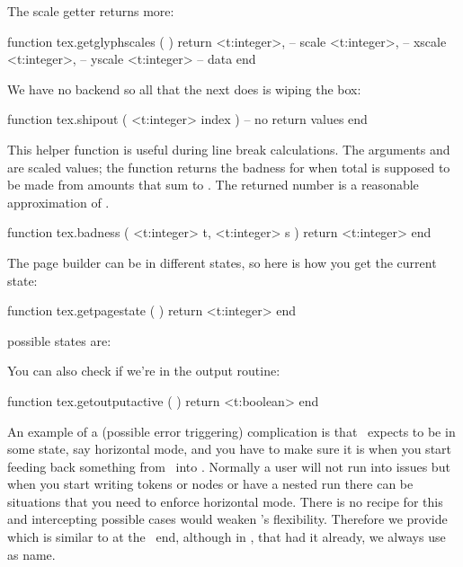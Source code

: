 The scale getter returns more:

\starttyping[option=LUA]
function tex.getglyphscales ( )
    return
        <t:integer>, -- scale
        <t:integer>, -- xscale
        <t:integer>, -- yscale
        <t:integer>  -- data
end
\stoptyping

\stopsubsection

\startsubsection [title={Whatever}]

We have no backend so all that the next does is wiping the box:

\starttyping[option=LUA]
function tex.shipout ( <t:integer> index )
    -- no return values
end
\stoptyping

This helper function is useful during line break calculations. The arguments
 and  are scaled values; the function returns the badness for
when total  is supposed to be made from amounts that sum to .
The returned number is a reasonable approximation of .

\starttyping[option=LUA]
function tex.badness (
    <t:integer> t,
    <t:integer> s
)
    return <t:integer>
end
\stoptyping

The page builder can be in different states, so here is how you get the current state:

\starttyping[option=LUA]
function tex.getpagestate ( )
    return <t:integer>
end
\stoptyping

possible states are:

\starttworows
{}
\stoptworows

You can also check if we're in the output routine:

\starttyping[option=LUA]
function tex.getoutputactive ( )
    return <t:boolean>
end
\stoptyping

An example of a (possible error triggering) complication is that \TEX\ expects to
be in some state, say horizontal mode, and you have to make sure it is when you
start feeding back something from \LUA\ into \TEX. Normally a user will not run
into issues but when you start writing tokens or nodes or have a nested run there
can be situations that you need to enforce horizontal mode. There is no recipe
for this and intercepting possible cases would weaken \LUATEX's flexibility.
Therefore we provide  which is similar to \type {\quitvmode} at
the \TEX\ end, although in \CONTEXT, that had it already, we always use \type
{\dontleavehmode} as name.

